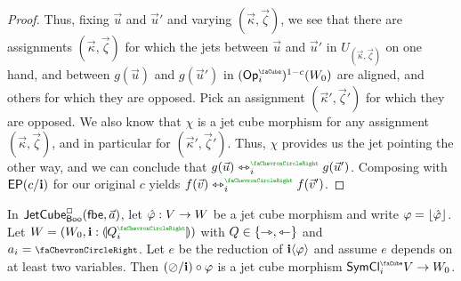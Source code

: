 \documentclass[a4paper]{memoir}
\begin{document}
\begin{proof}
	Thus, fixing $\vec u$ and $\vec u'$ and varying $(\vec \kappa, \vec \zeta)$, we see that there are assignments $(\vec \kappa, \vec \zeta)$ for which the jets between $\vec u$ and $\vec u'$ in $U_{(\vec \kappa, \vec \zeta)}$ on one hand, and between $g(\vec u)$ and $g(\vec u')$ in $(\Opcube_i)^{1-c}(W_0)$ are aligned, and others for which they are opposed.
	Pick an assignment $(\vec \kappa', \vec \zeta')$ for which they are opposed.
	We also know that $\chi$ is a jet cube morphism for any assignment $(\vec \kappa, \vec \zeta)$, and in particular for $(\vec \kappa', \vec \zeta')$.
	Thus, $\chi$ provides us the jet pointing the other way, and we can conclude that $g(\vec u) \equijet_i\pmr{\ypolar} g(\vec u')$.
	Composing with $\mathsf{EP}(c/\mathbf{i})$ for our original $c$ yields $f(\vec v) \equijet_i\pmr{\ypolar} f(\vec v')$.
\end{proof}
\begin{corollary} \label{thm:weaken-connection}
	In $\mathsf{JetCube}^{\Box}_{\mathsf{Boo}}({\mathsf{fbe}},\vec a)$, let $\hat {\varphi} : V \to W$ be a jet cube morphism and write $\varphi = \mathopen{}\left\lfloor \hat {\varphi} \right\rfloor\mathclose{}$.
	Let $W = (W_0, \dm i : \rival{Q_i\pmr{\ypolar}})$ with $Q \in \mathopen{}\left\{ \rightarrowtriangle, \leftarrowtriangle \right\}\mathclose{}$ and $a_i = \ypolar$.
	Let $e$ be the reduction of $\mathbf{i} \langle \varphi \rangle$ and assume $e$ depends on at least two variables.
	Then $(\oslash/\mathbf{i}) \circ \varphi$ is a jet cube morphism $\UFsymcube_i V \to W_0$.
\end{corollary}
\end{document}
